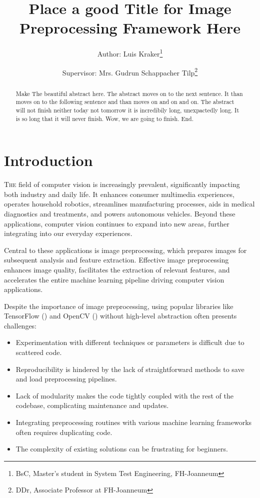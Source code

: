 \documentclass[journal]{new-aiaa}
\title{Place a good Title for Image Preprocessing Framework Here}
\author{Author: Luis Kraker\footnote{BsC, Master's student in System Test Engineering, FH-Joanneum}}
\affil{FH-Joanneum, Graz 8020, Austria}
\author{Supervisor: Mrs. Gudrun Schappacher Tilp\footnote{DDr, Associate Professor at FH-Joanneum}}
\affil{FH-Joanneum, Graz 8020, Austria}
\begin{document}
\maketitle

\begin{abstract}
	Make The beautiful abstract here. The abstract moves on to the next sentence. It than moves on to the following sentence and than moves on and on and on. The abstract will not finish neither today not tomorrow it is incredibily long, unexpactedly long. It is so long that it will never finish. Wow, we are going to finish. End.
\end{abstract}


\section{Introduction}
\lettrine{T}{he} field of computer vision is increasingly prevalent, significantly impacting both industry and daily life. It enhances consumer multimedia experiences, operates household robotics, streamlines manufacturing processes, aids in medical diagnostics and treatments, and powers autonomous vehicles.\cite{bebis2002review} Beyond these applications, computer vision continues to expand into new areas, further integrating into our everyday experiences.\cite{szeliski2010computer}


Central to these applications is image preprocessing, which prepares images for subsequent analysis and feature extraction.\cite{gonzalez2002digital} Effective image preprocessing enhances image quality, facilitates the extraction of relevant features, and accelerates the entire machine learning pipeline driving computer vision applications.\cite{nelson2020image}\cite{krig2014image}

Despite the importance of image preprocessing, using popular libraries like TensorFlow (\cite{tensorflow2015}) and OpenCV (\cite{opencv2000}) without high-level abstraction often presents challenges:
\begin{itemize}
	\item Experimentation with different techniques or parameters is difficult due to scattered code.
	\item Reproducibility is hindered by the lack of straightforward methods to save and load preprocessing pipelines.
	\item Lack of modularity makes the code tightly coupled with the rest of the codebase, complicating maintenance and updates.
	\item Integrating preprocessing routines with various machine learning frameworks often requires duplicating code.
	\item The complexity of existing solutions can be frustrating for beginners.
\end{itemize}
\end{document}
